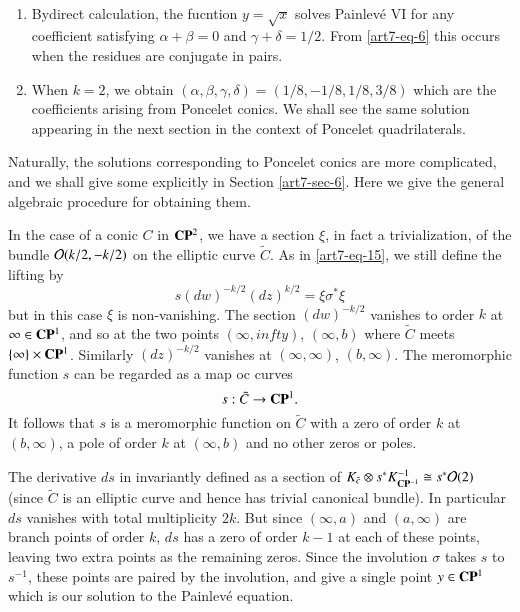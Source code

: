 \medskip
\begin{remarks*}
~
\begin{enumerate}[1.]
\item By\pageoriginale direct calculation, the fucntion $y=\sqrt{x}$ solves Painlev\'e VI for any coefficient satisfying $\alpha + \beta = 0$ and $\gamma +\delta =1/2$. From \eqref{art7-eq-6} this occurs when the residues are conjugate in pairs.

\item When $k=2$, we obtain $(\alpha, \beta, \gamma, \delta) = (1/8, -1/8, 1/8, 3/8)$ which are the coefficients arising from Poncelet conics. We shall see the same solution appearing in the next section in the context of Poncelet quadrilaterals.
\end{enumerate}
\end{remarks*}

\noindent
Naturally, the solutions corresponding to Poncelet conics are more complicated, and we shall give some explicitly in Section \ref{art7-sec-6}. Here we give the general algebraic procedure for obtaining them.

In the case of a conic $C$ in $\mathbf{C}\mathbf{P}^{2}$, we have a section $\xi$, in fact a trivialization, of the bundle $\mathcal{O}(k/2, -k/2)$ on the elliptic curve $\tilde{C}$. As in \eqref{art7-eq-15}, we still define the lifting by
$$
s(dw)^{-k/2}(dz)^{k/2}=\xi\sigma^{*}\xi
$$
but in this case $\xi$ is non-vanishing. The section $(dw)^{-k/2}$ vanishes to order $k$ at $\infty \in \mathbf{C}\mathbf{P}^{1}$, and so at the two points $(\infty, infty)$, $(\infty, b)$ where $\tilde{C}$ meets $\{\infty\} \times \mathbf{C}\mathbf{P}^{1}$. Similarly $(dz)^{-k/2}$ vanishes at $(\infty, \infty)$, $(b, \infty)$. The meromorphic function $s$ can be regarded as a map oc curves
$$
s:\tilde{C}\rightarrow \mathbf{C}\mathbf{P}^{1}.
$$
It follows that $s$ is a meromorphic function on $\tilde{C}$ with a zero of order $k$ at $(b, \infty)$, a pole of order $k$ at $(\infty, b)$ and no other zeros or poles.

The derivative $ds$ in  invariantly defined as a section of $K_{\tilde{c}} \otimes s^{*}K_{\mathbf{C}\mathbf{P}^{-1}}^{-1} \cong s^{*}\mathcal{O}(2)$ (since $\tilde{C}$ is an elliptic curve and hence has trivial canonical bundle). In particular $ds$ vanishes with total multiplicity $2k$. But since $(\infty, a)$ and $(a, \infty)$ are branch points of order $k$, $ds$ has a zero of order $k-1$ at each of these points, leaving two extra points as the remaining zeros. Since the involution $\sigma$ takes $s$ to $s^{-1}$, these points are paired by the involution, and give a single point $y \in \mathbf{C}\mathbf{P}^{1}$ which is our solution to the Painlev\'e equation.

